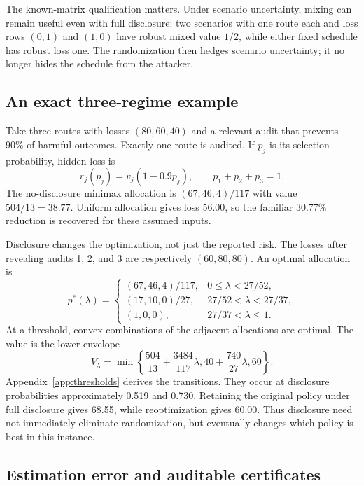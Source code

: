 \documentclass[11pt,letterpaper]{article}
\begin{document}
The known-matrix qualification matters. Under scenario uncertainty, mixing can remain useful even with full disclosure: two scenarios with one route each and loss rows $(0,1)$ and $(1,0)$ have robust mixed value $1/2$, while either fixed schedule has robust loss one. The randomization then hedges scenario uncertainty; it no longer hides the schedule from the attacker.

\subsection{An exact three-regime example}

Take three routes with losses $(80,60,40)$ and a relevant audit that prevents 90\% of harmful outcomes. Exactly one route is audited. If $p_j$ is its selection probability, hidden loss is
\begin{equation}
r_j(p_j)=v_j(1-0.9p_j),\qquad p_1+p_2+p_3=1.
\label{eq:small}
\end{equation}
The no-disclosure minimax allocation is $(67,46,4)/117$ with value $504/13=38.77$. Uniform allocation gives loss 56.00, so the familiar 30.77\% reduction is recovered for these assumed inputs.

Disclosure changes the optimization, not just the reported risk. The losses after revealing audits 1, 2, and 3 are respectively $(60,80,80)$. An optimal allocation is
\begin{equation}
p^*(\lambda)=
\begin{cases}
(67,46,4)/117,&0\leq\lambda<27/52,\\
(17,10,0)/27,&27/52<\lambda<27/37,\\
(1,0,0),&27/37<\lambda\leq1.
\end{cases}
\label{eq:thresholds}
\end{equation}
At a threshold, convex combinations of the adjacent allocations are optimal. The value is the lower envelope
\begin{equation}
V_\lambda=\min\left\{
\frac{504}{13}+\frac{3484}{117}\lambda,
40+\frac{740}{27}\lambda,
60\right\}.
\label{eq:envelope}
\end{equation}
Appendix~\ref{app:thresholds} derives the transitions. They occur at disclosure probabilities approximately 0.519 and 0.730. Retaining the original policy under full disclosure gives 68.55, while reoptimization gives 60.00. Thus disclosure need not immediately eliminate randomization, but eventually changes which policy is best in this instance.

\subsection{Estimation error and auditable certificates}
\end{document}
